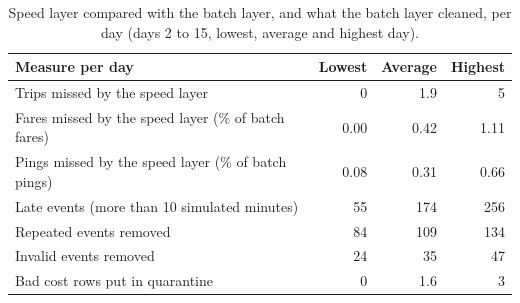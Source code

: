 \begin{table}[!htb]
\centering\small
\caption{Speed layer compared with the batch layer, and what the batch layer cleaned, per day (days 2 to 15, lowest, average and highest day).}
\label{tab:recon}
\begin{tabularx}{\textwidth}{@{}L rrr@{}}
\toprule
\textbf{Measure per day} & \textbf{Lowest} & \textbf{Average} & \textbf{Highest} \\
\midrule
Trips missed by the speed layer & 0 & 1.9 & 5 \\
Fares missed by the speed layer (\% of batch fares) & 0.00 & 0.42 & 1.11 \\
Pings missed by the speed layer (\% of batch pings) & 0.08 & 0.31 & 0.66 \\
Late events (more than 10 simulated minutes) & 55 & 174 & 256 \\
Repeated events removed & 84 & 109 & 134 \\
Invalid events removed & 24 & 35 & 47 \\
Bad cost rows put in quarantine & 0 & 1.6 & 3 \\
\bottomrule
\end{tabularx}
\end{table}
